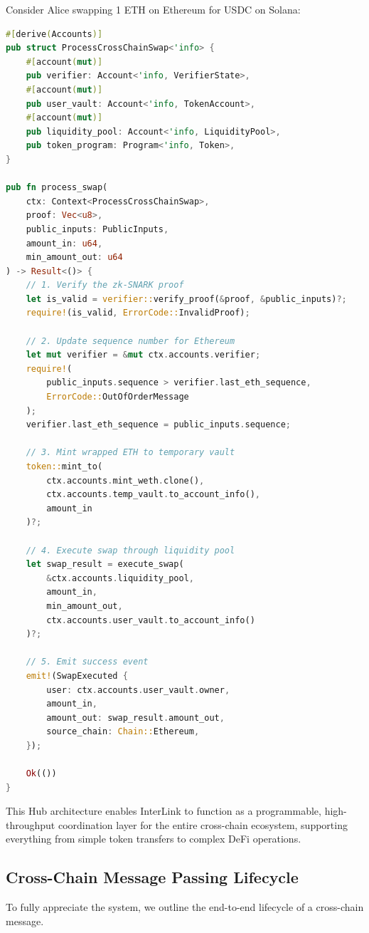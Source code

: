 \documentclass[11pt,a4paper]{article}
\begin{document}
Consider Alice swapping 1 ETH on Ethereum for USDC on Solana:

\begin{lstlisting}[language=Rust, caption={Solana Hub Verification and Execution}]
#[derive(Accounts)]
pub struct ProcessCrossChainSwap<'info> {
    #[account(mut)]
    pub verifier: Account<'info, VerifierState>,
    #[account(mut)]
    pub user_vault: Account<'info, TokenAccount>,
    #[account(mut)]
    pub liquidity_pool: Account<'info, LiquidityPool>,
    pub token_program: Program<'info, Token>,
}

pub fn process_swap(
    ctx: Context<ProcessCrossChainSwap>,
    proof: Vec<u8>,
    public_inputs: PublicInputs,
    amount_in: u64,
    min_amount_out: u64
) -> Result<()> {
    // 1. Verify the zk-SNARK proof
    let is_valid = verifier::verify_proof(&proof, &public_inputs)?;
    require!(is_valid, ErrorCode::InvalidProof);
    
    // 2. Update sequence number for Ethereum
    let mut verifier = &mut ctx.accounts.verifier;
    require!(
        public_inputs.sequence > verifier.last_eth_sequence,
        ErrorCode::OutOfOrderMessage
    );
    verifier.last_eth_sequence = public_inputs.sequence;
    
    // 3. Mint wrapped ETH to temporary vault
    token::mint_to(
        ctx.accounts.mint_weth.clone(),
        ctx.accounts.temp_vault.to_account_info(),
        amount_in
    )?;
    
    // 4. Execute swap through liquidity pool
    let swap_result = execute_swap(
        &ctx.accounts.liquidity_pool,
        amount_in,
        min_amount_out,
        ctx.accounts.user_vault.to_account_info()
    )?;
    
    // 5. Emit success event
    emit!(SwapExecuted {
        user: ctx.accounts.user_vault.owner,
        amount_in,
        amount_out: swap_result.amount_out,
        source_chain: Chain::Ethereum,
    });
    
    Ok(())
}
\end{lstlisting}

This Hub architecture enables InterLink to function as a programmable, high-throughput coordination layer for the entire cross-chain ecosystem, supporting everything from simple token transfers to complex DeFi operations.

\subsection{Cross-Chain Message Passing Lifecycle}
To fully appreciate the system, we outline the end-to-end lifecycle of a cross-chain message.
\end{document}
